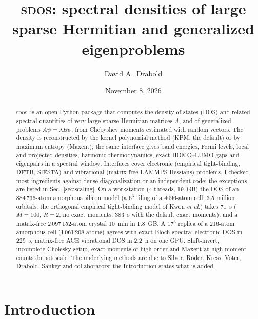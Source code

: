 \documentclass[reprint,nofootinbib,superscriptaddress,amsmath,amssymb,aps,prb,floatfix]{revtex4-2}
\newcommand{\sdos}{\textsc{sdos}}
\begin{document}
\title{\sdos: spectral densities of large sparse Hermitian and generalized eigenproblems}

\author{David A.\ Drabold}

\date{November 8, 2026}

\begin{abstract}
\sdos\ is an open Python package that computes the density of states (DOS) and related spectral quantities of very large sparse Hermitian matrices $A$, and of generalized problems $A\psi=\lambda B\psi$, from Chebyshev moments estimated with random vectors. The density is reconstructed by the kernel polynomial method (KPM, the default) or by maximum entropy (Maxent); the same interface gives band energies, Fermi levels, local and projected densities, harmonic thermodynamics, exact HOMO--LUMO gaps and eigenpairs in a spectral window. Interfaces cover electronic (empirical tight-binding, DFTB, SIESTA) and vibrational (matrix-free LAMMPS Hessians) problems.
I checked most ingredients against dense diagonalization or an independent code; the exceptions are listed in Sec.~\ref{sec:scaling}.
On a workstation (4 threads, 19~GB) the DOS of an 884\,736-atom amorphous silicon model (a $6^3$ tiling of a 4096-atom cell; 3.5 million orbitals; the orthogonal empirical tight-binding model of Kwon \emph{et al.}) takes 71~s ($M=100$, $R=2$, no exact moments; 383~s with the default exact moments), and a matrix-free 2\,097\,152-atom crystal 10~min in 1.8~GB. A $17^3$ replica of a 216-atom amorphous cell (1\,061\,208 atoms) agrees with exact Bloch spectra: electronic DOS in 229~s, matrix-free ACE vibrational DOS in 2.2~h on one GPU.
Shift-invert, incomplete-Cholesky setup, exact moments of high order and Maxent at high moment counts do not scale. The underlying methods are due to Silver, R\"oder, Kress, Voter, Drabold, Sankey and collaborators; the Introduction states what is added.
\end{abstract}

\maketitle

\section{Introduction}
\label{sec:intro}
\end{document}
